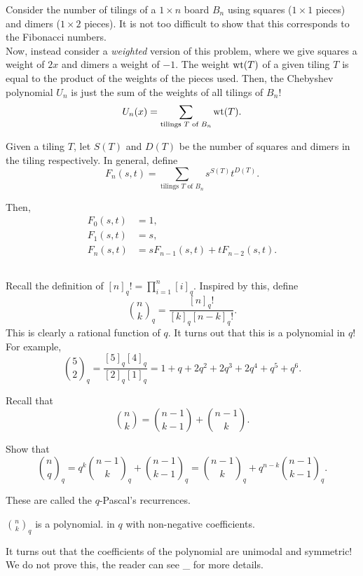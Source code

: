 	Consider the number of tilings of a $1\times n$ board $B_n$ using squares ($1\times 1$ pieces) and dimers ($1\times 2$ pieces). It is not too difficult to show that this corresponds to the Fibonacci numbers.\\
	Now, instead consider a \emph{weighted} version of this problem, where we give squares a weight of $2x$ and dimers a weight of $-1$. The weight $\operatorname{wt}(T)$ of a given tiling $T$ is equal to the product of the weights of the pieces used. Then, the Chebyshev polynomial $U_n$ is just the sum of the weights of all tilings of $B_n$!
	\[ U_n(x) = \sum_{\text{tilings $T$ of $B_n$}} \operatorname{wt}(T). \]


	Given a tiling $T$, let $S(T)$ and $D(T)$ be the number of squares and dimers in the tiling respectively.
	In general, define
	\[ F_n(s,t) = \sum_{\text{tilings $T$ of $B_n$}} s^{S(T)} t^{D(T)}. \]

	Then,
	\begin{align*}
		F_0(s,t) &= 1, \\
		F_1(s,t) &= s, \\
		F_n(s,t) &= sF_{n-1}(s,t) + tF_{n-2}(s,t).
	\end{align*}

\subsection{}

	Recall the definition of $[n]_q! = \prod_{i=1}^n [i]_q$. Inspired by this, define
	\[ \binom{n}{k}_q = \frac{[n]_q!}{[k]_q[n-k]_q!}. \]
	This is clearly a rational function of $q$. It turns out that this is a polynomial in $q$! For example,
	\[ \binom{5}{2}_q = \frac{[5]_q[4]_q}{[2]_q[1]_q} = 1 + q + 2q^2 + 2q^3 + 2q^4 + q^5 + q^6. \]

	Recall that
	\[ \binom{n}{k} = \binom{n-1}{k-1} + \binom{n-1}{k}. \]

	\begin{exercise}
		Show that
		\[ \binom{n}{q}_q = q^k \binom{n-1}{k}_q + \binom{n-1}{k-1}_q = \binom{n-1}{k}_q + q^{n-k} \binom{n-1}{k-1}_q . \]
	\end{exercise}
	These are called the $q$-Pascal's recurrences.

	\begin{fcor}
		$\binom{n}{k}_q$ is a polynomial. in $q$ with non-negative coefficients.
	\end{fcor}
	It turns out that the coefficients of the polynomial are unimodal and symmetric! We do not prove this, the reader can see _ for more details.

